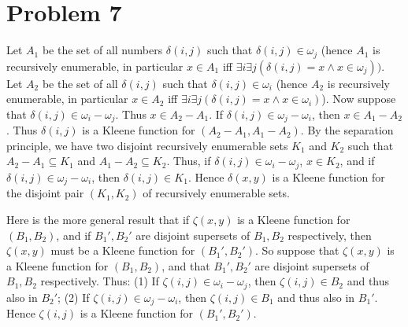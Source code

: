 \documentclass{article}
\theoremstyle{definition}
\begin{document}
\section*{Problem 7}
Let $A_1$ be the set of all numbers $\delta(i,j)$ such that $\delta(i,j)\in\omega_j$ (hence $A_1$ is recursively enumerable, in particular $x\in A_1$ iff
$\exists i\exists j(\delta(i,j)=x\wedge x\in\omega_j))$. Let $A_2$ be the set of all $\delta(i,j)$ such that 
$\delta(i,j)\in\omega_i$ (hence $A_2$ is recursively enumerable, in particular $x\in A_2$ iff $\exists i\exists j(\delta(i,j)=x\wedge x\in\omega_i)$). Now suppose that 
$\delta(i,j)\in\omega_i-\omega_j$. Thus $x\in A_2-A_1$. If $\delta(i,j)\in\omega_j-\omega_i$, then $x\in A_1-A_2$. Thus $\delta(i,j)$ is a Kleene function for $(A_2-A_1,A_1-A_2)$. 
By the separation principle, we have two disjoint recursively enumerable sets $K_1$ and $K_2$ such that $A_2-A_1\subseteq K_1$ and $A_1-A_2\subseteq K_2$. 
Thus, if $\delta(i,j)\in\omega_i-\omega_j$, 
$x\in K_2$, and if $\delta(i,j)\in\omega_j-\omega_i$, then $\delta(i,j)\in K_1$. Hence $\delta(x,y)$ is a Kleene function for the disjoint pair $(K_1,K_2)$ of recursively enumerable sets.


Here is the more general result that if $\zeta(x,y)$ is a Kleene function for $(B_1,B_2)$, and if $B_1',B_2'$ are disjoint supersets of $B_1,B_2$ respectively, then $\zeta(x,y)$ must be 
a Kleene function for $(B_1',B_2')$. So suppose that $\zeta(x,y)$ is a Kleene function for $(B_1,B_2)$, and that $B_1',B_2'$ are disjoint supersets of $B_1,B_2$ respectively. Thus:\newline
(1) If $\zeta(i,j)\in\omega_i-\omega_j$, then $\zeta(i,j)\in B_2$ and thus also in $B_2'$;\newline
(2) If $\zeta(i,j)\in\omega_j-\omega_i$, then $\zeta(i,j)\in B_1$ and thus also in $B_1'$.\newline
Hence $\zeta(i,j)$ is a Kleene function for $(B_1',B_2')$.
\end{document}

